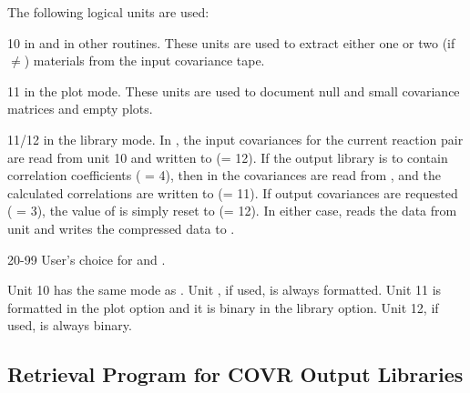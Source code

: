 The following logical units are used:
\begin{description}
\begin{singlespace}

\item[10]    in  and  in
other routines.  These units are used to extract either one or two (if
$\neq$) materials from the input covariance
tape.

\item[11]    in the plot mode.  These units are used
to document null and small covariance matrices and empty plots.

\item[11/12]   in the library mode.  In
, the input covariances for the current reaction pair are
read from unit 10 and written to  (= 12).  If the output
library is to contain correlation coefficients ( = 4),
then in  the covariances are read from , and
the calculated correlations are written to  (= 11).  If
output covariances are requested ( = 3), the value of
 is simply reset to  (= 12).  In either case,
 reads the data from unit  and writes the
compressed data to .

\item[20-99]   User's choice for  and .

\end{singlespace}
\end{description}

\noindent
Unit 10 has the same mode as .  Unit , if used, is
always formatted.  Unit 11 is formatted in the plot option and it is binary
in the library option.  Unit 12, if used, is always binary.


\subsection {Retrieval Program for COVR Output Libraries}
\label{ssCOVR_retrieval}

